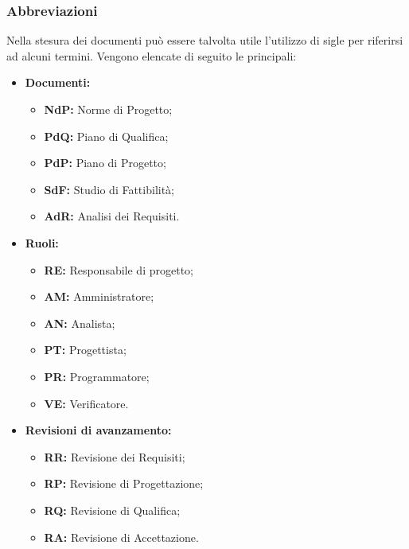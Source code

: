   \subsubsection{Abbreviazioni}
  Nella stesura dei documenti può essere talvolta utile l'utilizzo di sigle per riferirsi ad alcuni termini. Vengono elencate di seguito le principali:
  \begin{itemize}
  	\item \textbf{Documenti:}
  	\begin{itemize}
	  	\item \textbf{NdP:} Norme di Progetto;
	  	\item \textbf{PdQ:} Piano di Qualifica;
	  	\item \textbf{PdP:} Piano di Progetto;
	  	\item \textbf{SdF:} Studio di Fattibilità;
	  	\item \textbf{AdR:} Analisi dei Requisiti.
  	\end{itemize}
  	\item \textbf{Ruoli:}
  	\begin{itemize}
  		\item \textbf{RE:} Responsabile di progetto;
  		\item \textbf{AM:} Amministratore;
  		\item \textbf{AN:} Analista;
  		\item \textbf{PT:} Progettista;
  		\item \textbf{PR:} Programmatore;
  		\item \textbf{VE:} Verificatore. 
  	\end{itemize}
  	\item \textbf{Revisioni di avanzamento:}
  	\begin{itemize}
  		\item \textbf{RR:} Revisione dei Requisiti;
  		\item \textbf{RP:} Revisione di Progettazione;
  		\item \textbf{RQ:} Revisione di Qualifica;
  		\item \textbf{RA:} Revisione di Accettazione.
  	\end{itemize}
  	
  \end{itemize}
